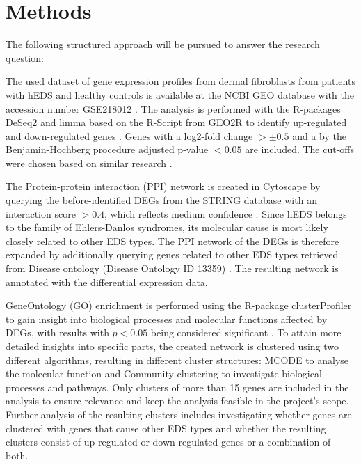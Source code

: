 \section{Methods}
The following structured approach will be pursued to answer the research question:

\begin{description}[leftmargin=5pt]
	\item [Analysis of Differentially Expressed Genes (DEGs).]\label{sec:methods-deg}The used dataset of gene expression profiles from dermal fibroblasts from patients with hEDS and healthy controls is available at the NCBI GEO database with the accession number GSE218012 \cite{Ritelli2020}. The analysis is performed with the R-packages DeSeq2 and limma based on the R-Script from GEO2R to identify up-regulated and down-regulated genes \cite{DESeq2, limma}. Genes with a log2-fold change $> \pm 0.5$ and a by the Benjamin-Hochberg procedure adjusted p-value $< 0.05$ are included. The cut-offs were chosen based on similar research \cite{Karimizadeh2019, Lim2019}.

	\item[Network Creation.] The Protein-protein interaction (PPI) network is created in Cytoscape \cite{Cytoscape} by querying the before-identified DEGs from the STRING database with an interaction score $> 0.4$, which reflects medium confidence \cite{StringDB}. Since hEDS belongs to the family of Ehlers-Danlos syndromes, its molecular cause is most likely closely related to other EDS types. The PPI network of the DEGs is therefore expanded by additionally querying genes related to other EDS types retrieved from Disease ontology (Disease Ontology ID 13359) \cite{DO}. The resulting network is annotated with the differential expression data.
	
	\item[Gene Ontology and Clustering.]GeneOntology (GO) enrichment is performed using the R-package clusterProfiler to gain insight into biological processes and molecular functions affected by DEGs, with results with $p < 0.05$ being considered significant \cite{Ashburner2000,Consortium2023, Wu2021}. To attain more detailed insights into specific parts, the created network is clustered using two different algorithms, resulting in different cluster structures: MCODE to analyse the molecular function and Community clustering to investigate biological processes and pathways. Only clusters of more than 15 genes are included in the analysis to ensure relevance and keep the analysis feasible in the project's scope. Further analysis of the resulting clusters includes investigating whether genes are clustered with genes that cause other EDS types and whether the resulting clusters consist of up-regulated or down-regulated genes or a combination of both.
	

\end{description}
